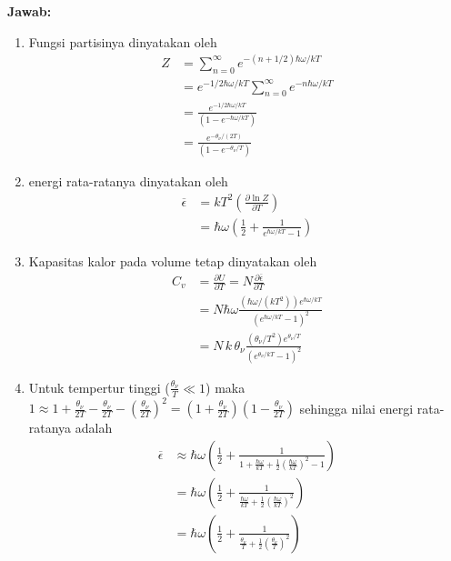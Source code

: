 \documentclass[a4paper , 12 pt]{article}
\begin{document}
\begin{enumerate}
\begin{enumerate}
\end{enumerate}
\textbf{Jawab:}
\begin{enumerate}
\item Fungsi partisinya dinyatakan oleh
\begin{align}
Z &= \sum_{n = 0}^{\infty} e^{-(n+ 1/2)\hbar\omega /kT} \nonumber \\
& = e^{- 1/2 \hbar\omega /k T}\sum_{n=0}^{\infty} e^{-n \hbar\omega /kT} \nonumber \\
& = \frac{e^{-1/2 \hbar\omega / kT}}{(1 - e^{-\hbar\omega /kT})} \nonumber  \\
& = \frac{e^{- \theta_\nu /(2T)}}{(1 - e^{-\theta_\nu/ T})} \nonumber
\end{align}
\item energi rata-ratanya dinyatakan oleh
\begin{align}
\overline{\epsilon} & = kT^2 \left( \frac{\partial \ln Z}{\partial T}\right) \nonumber \\
& = \hbar \omega \left(\frac{1}{2} + \frac{1}{e^{\hbar \omega /k T} - 1}\right) \nonumber 
\end{align}
\item Kapasitas kalor pada volume tetap dinyatakan oleh
\begin{align}
C_v &= \frac{\partial U}{\partial T} = N \frac{\partial \overline{\epsilon}}{\partial T} \nonumber \\
& = N \hbar \omega \frac{(\hbar \omega /(kT^2) )e^{\hbar \omega /kT}}{(e^{\hbar \omega / k T } - 1)^2} \nonumber \\
& = N\,k \, \theta_\nu  \frac{(\theta_\nu/T^2) e^{\theta_\nu/ T}}{(e^{\theta_\nu/kT} - 1)^2} \nonumber
\end{align}
\item Untuk tempertur tinggi ($ \frac{\theta_\nu}{T} \ll 1$) maka  $1  \approx 1 + \frac{\theta_\nu}{2T} - \frac{\theta_\nu}{2T} - \left( \frac{\theta_\nu}{2T}\right)^2  = (1+  \frac{\theta_\nu}{2T})(1 -   \frac{\theta_\nu}{2T})$ sehingga nilai energi rata-ratanya adalah
\begin{align}
\overline{\epsilon} & \approx \hbar \omega \left( \frac{1}{2} + \frac{1}{1+\frac{\hbar \omega}{k T} +\frac{1}{2} \left(\frac{\hbar \omega}{k T}\right)^2 - 1}\right) \nonumber \\
 & = \hbar \omega \left( \frac{1}{2} + \frac{1}{\frac{\hbar \omega}{k T} + \frac{1}{2}\left(\frac{\hbar \omega}{k T}\right)^2}  \right) \nonumber \\
 & = \hbar \omega \left( \frac{1}{2} + \frac{1}{\frac{\theta_\nu}{T} + \frac{1}{2}\left(\frac{\theta_\nu}{T}\right)^2}\right)\nonumber \\

\end{align}
\end{enumerate}
\end{enumerate}
\end{document}
